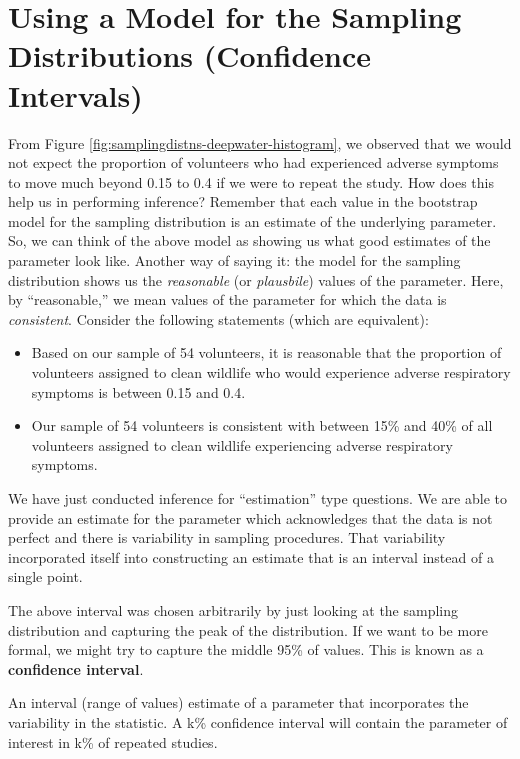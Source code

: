 \documentclass[]{book}
\providecommand{\tightlist}{%
  \setlength{\itemsep}{0pt}\setlength{\parskip}{0pt}}
\theoremstyle{definition}
\theoremstyle{definition}
\theoremstyle{remark}
\let\BeginKnitrBlock\begin \let\EndKnitrBlock\end
\begin{document}
\section{Using a Model for the Sampling Distributions (Confidence
Intervals)}\label{using-a-model-for-the-sampling-distributions-confidence-intervals}

From Figure \ref{fig:samplingdistns-deepwater-histogram}, we observed
that we would not expect the proportion of volunteers who had
experienced adverse symptoms to move much beyond 0.15 to 0.4 if we were
to repeat the study. How does this help us in performing inference?
Remember that each value in the bootstrap model for the sampling
distribution is an estimate of the underlying parameter. So, we can
think of the above model as showing us what good estimates of the
parameter look like. Another way of saying it: the model for the
sampling distribution shows us the \emph{reasonable} (or
\emph{plausbile}) values of the parameter. Here, by ``reasonable,'' we
mean values of the parameter for which the data is \emph{consistent}.
Consider the following statements (which are equivalent):

\begin{itemize}
\tightlist
\item
  Based on our sample of 54 volunteers, it is reasonable that the
  proportion of volunteers assigned to clean wildlife who would
  experience adverse respiratory symptoms is between 0.15 and 0.4.
\item
  Our sample of 54 volunteers is consistent with between 15\% and 40\%
  of all volunteers assigned to clean wildlife experiencing adverse
  respiratory symptoms.
\end{itemize}

We have just conducted inference for ``estimation'' type questions. We
are able to provide an estimate for the parameter which acknowledges
that the data is not perfect and there is variability in sampling
procedures. That variability incorporated itself into constructing an
estimate that is an interval instead of a single point.

The above interval was chosen arbitrarily by just looking at the
sampling distribution and capturing the peak of the distribution. If we
want to be more formal, we might try to capture the middle 95\% of
values. This is known as a \textbf{confidence interval}.

\BeginKnitrBlock{definition}[Confidence Interval]
\protect\hypertarget{def:defn-confidence-interval}{}{\label{def:defn-confidence-interval}
{} }An interval (range of values)
estimate of a parameter that incorporates the variability in the
statistic. A k\% confidence interval will contain the parameter of
interest in k\% of repeated studies.
\EndKnitrBlock{definition}
\end{document}

